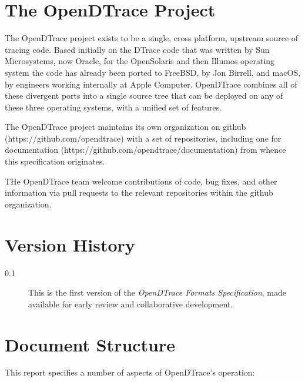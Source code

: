 \section{The OpenDTrace Project}
\label{sec:opendtrace-project}

The OpenDTrace project exists to be a single, cross platform, upstream
source of tracing code.  Based initially on the DTrace code that was
written by Sun Microsystems, now Oracle, for the OpenSolaris and then
Illumos operating system the code has already been ported to FreeBSD,
by Jon Birrell, and macOS, by engineers working internally at Apple
Computer.  OpenDTrace combines all of these divergent ports into a
single source tree that can be deployed on any of these three
operating systems, with a unified set of features.  

The OpenDTrace project maintains its own organization on github
(https://github.com/opendtrace) with a set of repositories, including
one for documentation (https://github.com/opendtrace/documentation)
from whence this specification originates.

THe OpenDTrace team welcome contributions of code, bug fixes, and
other information via pull requests to the relevant repositories
within the github organization.

\section{Version History}

\begin{description}
\item[0.1] This is the first version of the \textit{OpenDTrace Formats
  Specification}, made available for early review and collaborative
  development.
\end{description}

\section{Document Structure}

This report specifies a number of aspects of OpenDTrace's operation:

